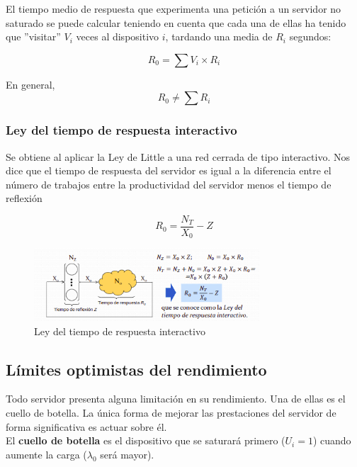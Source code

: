 \documentclass[12pt,spanish]{article}
\begin{document}
El tiempo medio de respuesta que experimenta una petición a un servidor no saturado se puede calcular teniendo en cuenta que cada una de ellas ha tenido que ''visitar'' $V_i$ veces al dispositivo $i$, tardando una media de $R_i$ segundos:

\begin{equation*}
	R_0=\sum{V_i \times R_i}
\end{equation*}

En general,
\begin{equation*}
	R_0 \not = \sum{R_i}
\end{equation*}

\subsubsection{Ley del tiempo de respuesta interactivo}

Se obtiene al aplicar la Ley de Little a una red cerrada de tipo interactivo. Nos dice que el tiempo de respuesta del servidor es igual a la diferencia entre el número de trabajos entre la productividad del servidor menos el tiempo de reflexión

\begin{equation*}
	R_0=\frac{N_T}{X_0} - Z
\end{equation*}

\begin{figure}[H]
	\centering
	\includegraphics[width=0.75\textwidth]{leyrespint.png}
	\caption{Ley del tiempo de respuesta interactivo}
\end{figure}

\subsection{Límites optimistas del rendimiento}

Todo servidor presenta alguna limitación en su rendimiento. Una de ellas es el cuello de botella. La única forma de mejorar las prestaciones del servidor de forma significativa es actuar sobre él.\\

El \textbf{cuello de botella} es el dispositivo que se saturará primero ($U_i=1$) cuando aumente la carga ($\lambda_0$ será mayor).\\
\end{document}
